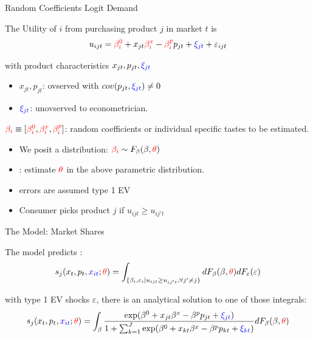 \documentclass[english]{beamer}
\begin{document}
\begin{frame}{Random Coefficients Logit Demand}
\begin{midi}
\item The Utility of $i$ from purchasing product $j$ in market $t$ is
\begin{equation}
u_{ijt} = {\color{red}{\beta_i^0}} + x_{jt}{\color{red}{\beta_i^x}} - {\color{red}{\beta_i^p}} p_{jt} + {\color{blue}{\xi_{jt}}} + \varepsilon_{ijt} \label{eq:demand}
\end{equation}
\item with product characteristics $x_{jt},p_{jt},{\color{blue}{\xi_{jt}}}$
\begin{itemize}
\item $x_{jt},p_{jt}$: ovserved with $cov(p_{jt},{\color{blue}{\xi_{jt}}})\neq 0$
\item ${\color{blue}{\xi_{jt}}}$: unovserved to econometrician.
\end{itemize}
\item ${\color{red}{\beta_i}} \equiv [{\color{red}{\beta_i^0}},{\color{red}{\beta_i^x}},{\color{red}{\beta_i^p}}]$: random coefficients or individual specific tastes to be estimated.
\begin{itemize}
\item We posit a distribution: ${\color{red}{\beta_i}} \sim F_\beta(\beta,{\color{red}{\theta}})$
\item {}: estimate ${\color{red}{\theta}}$ in the above parametric distribution.
\item errors are assumed type 1 EV
\item Consumer picks product $j$ if $u_{ijt}\geq u_{ij't}$
\end{itemize}
\end{midi}
\end{frame}

\begin{frame}{The Model: Market Shares}
\begin{midi}
\item The model predicts :
\begin{equation}
s_j(x_t,p_t,{\color{blue}{x_{it}}};{\color{red}{\theta}}) = \int_{\{\beta_i,\varepsilon_i | u_{ijt}\geq u_{ij't},\forall j'\neq j\}} dF_\beta(\beta,{\color{red}{\theta}}) dF_\varepsilon(\varepsilon)
\end{equation}
\item with type 1 EV shocks $\varepsilon$, there is an analytical solution to one of those integrals:
\begin{equation}
s_j(x_t,p_t,{\color{blue}{x_{it}}};{\color{red}{\theta}})  = \int_\beta \frac{\exp(\beta^0 + x_{jt}\beta^x - \beta^p p_{jt} + {\color{blue}{\xi_{jt}}})}{1+\sum_{k=1}^J \exp(\beta^0 + x_{kt}\beta^x - \beta^p p_{kt} + {\color{blue}{\xi_{kt}}})} dF_\beta(\beta,{\color{red}{\theta}})
\end{equation}
\end{midi}
\end{frame}
\end{document}
